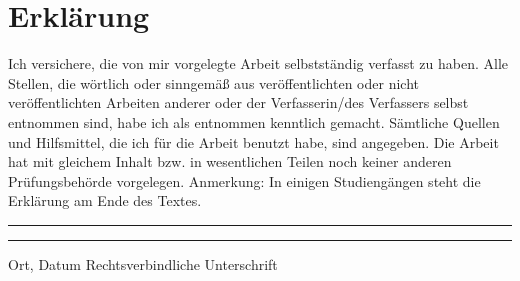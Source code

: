 \documentclass[a4paper,11pt]{article}%
\renewcommand{\\}{\vspace*{0.5\baselineskip} \newline}
\begin{document}
	\section*{Erklärung}
	Ich versichere, die von mir vorgelegte Arbeit selbstständig verfasst zu haben. Alle Stellen, die wörtlich oder sinngemäß aus veröffentlichten oder nicht veröffentlichten Arbeiten anderer oder der Verfasserin/des Verfassers selbst entnommen sind, habe ich als entnommen kenntlich gemacht. Sämtliche Quellen und Hilfsmittel, die ich für die Arbeit benutzt habe, sind angegeben. Die Arbeit hat mit gleichem Inhalt bzw. in wesentlichen Teilen noch keiner anderen Prüfungsbehörde vorgelegen.\\
	Anmerkung: In einigen Studiengängen steht die Erklärung am Ende des Textes.\\
	~\\
	~\\
	\rule{0.35\textwidth}{0.4pt} \hspace*{3cm} \rule{0.45\textwidth}{0.4pt} \newline
	Ort, Datum	\hspace*{6.3cm}	Rechtsverbindliche Unterschrift
	\newpage
\end{document}
